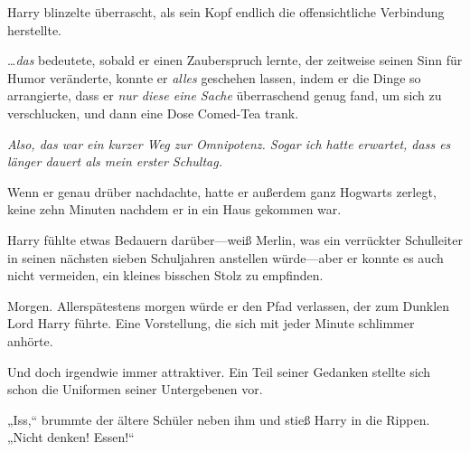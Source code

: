 Harry blinzelte überrascht, als sein Kopf endlich die offensichtliche Verbindung herstellte.

…\emph{das} bedeutete, sobald er einen Zauberspruch lernte, der zeitweise seinen Sinn für Humor veränderte, konnte er \emph{alles} geschehen lassen, indem er die Dinge so arrangierte, dass er \emph{nur diese eine Sache} überraschend genug fand, um sich zu verschlucken, und dann eine Dose Comed-Tea trank.

\emph{Also, das war ein kurzer Weg zur Omnipotenz. Sogar ich hatte erwartet, dass es länger dauert als mein erster Schultag.}

Wenn er genau drüber nachdachte, hatte er außerdem ganz Hogwarts zerlegt, keine zehn Minuten nachdem er in ein Haus gekommen war.

Harry fühlte etwas Bedauern darüber—weiß Merlin, was ein verrückter Schulleiter in seinen nächsten sieben Schuljahren anstellen würde—aber er konnte es auch nicht vermeiden, ein kleines bisschen Stolz zu empfinden.

Morgen. Allerspätestens morgen würde er den Pfad verlassen, der zum Dunklen Lord Harry führte. Eine Vorstellung, die sich mit jeder Minute schlimmer anhörte.

Und doch irgendwie immer attraktiver. Ein Teil seiner Gedanken stellte sich schon die Uniformen seiner Untergebenen vor.

„Iss,“ brummte der ältere Schüler neben ihm und stieß Harry in die Rippen. „Nicht denken! Essen!“

